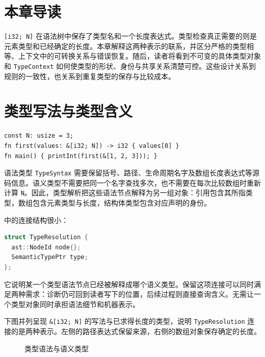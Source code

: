 \section*{本章导读}
\lstinline[language=Rustless]|[i32; N]| 在语法树中保存了类型名和一个长度表达式。类型检查真正需要的则是元素类型和已经确定的长度。本章解释这两种表示的联系，并区分严格的类型相等、上下文中的可转换关系与错误恢复。随后，读者将看到不可变的具体类型对象和 \texttt{TypeContext} 如何使类型的形状、身份与共享关系清楚可控。这些设计关系到规则的一致性，也关系到重复类型的保存与比较成本。

\section{类型写法与类型含义}
\begin{lstlisting}[language=Rustless]
const N: usize = 3;
fn first(values: &[i32; N]) -> i32 { values[0] }
fn main() { printInt(first(&[1, 2, 3])); }
\end{lstlisting}
语法类型 \texttt{TypeSyntax} 需要保留括号、路径、生命周期名字及数组长度表达式等源码信息。语义类型不需要把同一个名字查找多次，也不需要在每次比较数组时重新计算 \lstinline[language=Rustless]|N|。因此，类型解析把这些语法节点解释为另一组对象：引用包含其所指类型，数组包含元素类型与长度，结构体类型包含对应声明的身份。

 中的连接结构很小：
\begin{lstlisting}[language=C++]
struct TypeResolution {
  ast::NodeId node{};
  SemanticTypePtr type;
};
\end{lstlisting}
它说明某一个类型语法节点已经被解释成哪个语义类型。保留这项连接可以同时满足两种需求：诊断仍可回到读者写下的位置，后续过程则直接查询含义。无需让一个类型对象同时承担语法细节和机器表示。

下图并列呈现 \lstinline[language=Rustless]|&[i32; N]| 的写法与已求得长度的类型，说明 \texttt{TypeResolution} 连接的是两种表示。左侧的路径表达式保留来源，右侧的数组对象保存确定的长度。
\begin{figure}[htbp]
\centering
{}
\caption{类型语法与语义类型}
\end{figure}

